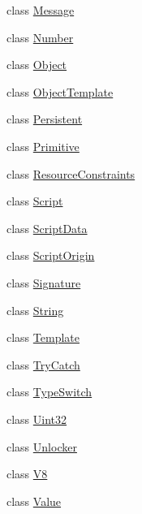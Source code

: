 \begin{DoxyCompactItemize}
class \hyperlink{classv8_1_1_message}{Message}
\item 
class \hyperlink{classv8_1_1_number}{Number}
\item 
class \hyperlink{classv8_1_1_object}{Object}
\item 
class \hyperlink{classv8_1_1_object_template}{Object\+Template}
\item 
class \hyperlink{classv8_1_1_persistent}{Persistent}
\item 
class \hyperlink{classv8_1_1_primitive}{Primitive}
\item 
class \hyperlink{classv8_1_1_resource_constraints}{Resource\+Constraints}
\item 
class \hyperlink{classv8_1_1_script}{Script}
\item 
class \hyperlink{classv8_1_1_script_data}{Script\+Data}
\item 
class \hyperlink{classv8_1_1_script_origin}{Script\+Origin}
\item 
class \hyperlink{classv8_1_1_signature}{Signature}
\item 
class \hyperlink{classv8_1_1_string}{String}
\item 
class \hyperlink{classv8_1_1_template}{Template}
\item 
class \hyperlink{classv8_1_1_try_catch}{Try\+Catch}
\item 
class \hyperlink{classv8_1_1_type_switch}{Type\+Switch}
\item 
class \hyperlink{classv8_1_1_uint32}{Uint32}
\item 
class \hyperlink{classv8_1_1_unlocker}{Unlocker}
\item 
class \hyperlink{classv8_1_1_v8}{V8}
\item 
class \hyperlink{classv8_1_1_value}{Value}
\end{DoxyCompactItemize}
